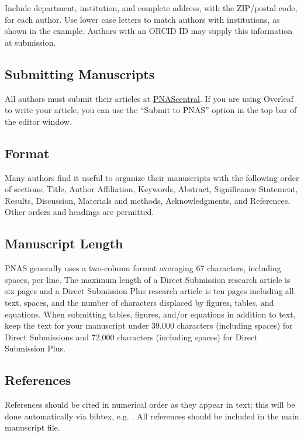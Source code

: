 \documentclass[9pt,twocolumn,twoside,lineno]{pnas-new}
\begin{document}
Include department, institution, and complete address, with the ZIP/postal code, for each author. Use lower case letters to match authors with institutions, as shown in the example. Authors with an ORCID ID may supply this information at submission.

\subsection*{Submitting Manuscripts}

All authors must submit their articles at \href{http://www.pnascentral.org/cgi-bin/main.plex}{PNAScentral}. If you are using Overleaf to write your article, you can use the ``Submit to PNAS'' option in the top bar of the editor window. 

\subsection*{Format}

Many authors find it useful to organize their manuscripts with the following order of sections;  Title, Author Affiliation, Keywords, Abstract, Significance Statement, Results, Discussion, Materials and methods, Acknowledgments, and References. Other orders and headings are permitted.

\subsection*{Manuscript Length}

PNAS generally uses a two-column format averaging 67 characters, including spaces, per line. The maximum length of a Direct Submission research article is six pages and a Direct Submission Plus research article is ten pages including all text, spaces, and the number of characters displaced by figures, tables, and equations.  When submitting tables, figures, and/or equations in addition to text, keep the text for your manuscript under 39,000 characters (including spaces) for Direct Submissions and 72,000 characters (including spaces) for Direct Submission Plus.

\subsection*{References}

References should be cited in numerical order as they appear in text; this will be done automatically via bibtex, e.g. . All references should be included in the main manuscript file.  
\end{document}

